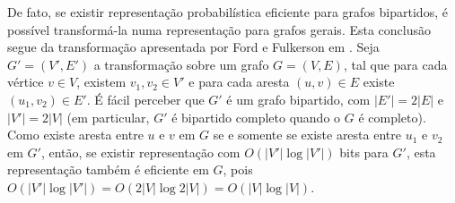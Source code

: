 De fato, se existir representação probabilística eficiente para grafos bipartidos, é possível transformá-la numa representação para grafos gerais. Esta conclusão segue da transformação apresentada por Ford e Fulkerson em \cite{ford1962flows}. Seja $G' = (V', E')$ a transformação sobre um grafo $G = (V, E)$, tal que para cada vértice $v \in V$, existem $v_1, v_2 \in V'$ e para cada aresta $(u, v) \in E$ existe $(u_1, v_2) \in E'$. É fácil perceber que $G'$ é um grafo bipartido, com $|E'| = 2|E|$ e $|V'| = 2|V|$ (em particular, $G'$ é bipartido completo quando o $G$ é completo). Como existe aresta entre $u$ e $v$ em $G$ se e somente se existe aresta entre $u_1$ e $v_2$ em $G'$, então, se existir representação com $O(|V'| \log |V'|)$ bits para $G'$, esta representação também é eficiente em $G$, pois $O(|V'| \log |V'|) = O(2|V| \log 2|V|) = O(|V| \log |V|)$.